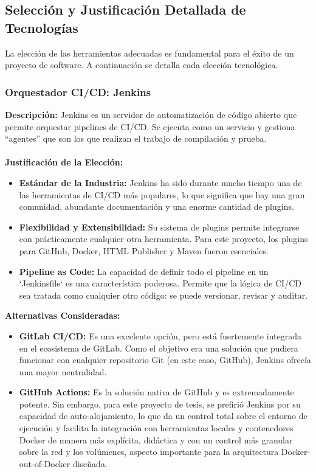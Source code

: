 \subsection{Selección y Justificación Detallada de Tecnologías}

La elección de las herramientas adecuadas es fundamental para el éxito de un proyecto de software. A continuación se detalla cada elección tecnológica.

\subsubsection{Orquestador CI/CD: Jenkins}
\textbf{Descripción:} Jenkins es un servidor de automatización de código abierto que permite orquestar pipelines de CI/CD. Se ejecuta como un servicio y gestiona ``agentes'' que son los que realizan el trabajo de compilación y prueba.
\\
\\
\textbf{Justificación de la Elección:}
\begin{itemize}
    \item \textbf{Estándar de la Industria:} Jenkins ha sido durante mucho tiempo una de las herramientas de CI/CD más populares, lo que significa que hay una gran comunidad, abundante documentación y una enorme cantidad de plugins.
    \item \textbf{Flexibilidad y Extensibilidad:} Su sistema de plugins permite integrarse con prácticamente cualquier otra herramienta. Para este proyecto, los plugins para GitHub, Docker, HTML Publisher y Maven fueron esenciales.
    \item \textbf{Pipeline as Code:} La capacidad de definir todo el pipeline en un `Jenkinsfile` es una característica poderosa. Permite que la lógica de CI/CD sea tratada como cualquier otro código: se puede versionar, revisar y auditar.
\end{itemize}
\textbf{Alternativas Consideradas:}
\begin{itemize}
    \item \textbf{GitLab CI/CD:} Es una excelente opción, pero está fuertemente integrada en el ecosistema de GitLab. Como el objetivo era una solución que pudiera funcionar con cualquier repositorio Git (en este caso, GitHub), Jenkins ofrecía una mayor neutralidad.
    \item \textbf{GitHub Actions:} Es la solución nativa de GitHub y es extremadamente potente. Sin embargo, para este proyecto de tesis, se prefirió Jenkins por su capacidad de auto-alojamiento, lo que da un control total sobre el entorno de ejecución y facilita la integración con herramientas locales y contenedores Docker de manera más explícita, didáctica y con un control más granular sobre la red y los volúmenes, aspecto importante para la arquitectura Docker-out-of-Docker diseñada.
\end{itemize}

